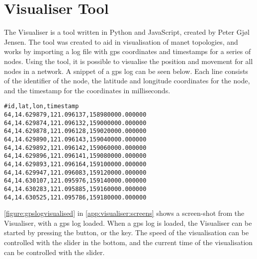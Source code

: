 \section{Visualiser Tool}\label{sec:visualiser}
The Visualiser is a tool written in Python and JavaScript, created by Peter Gjøl Jensen. The tool was created
to aid in visualisation of \gls{manet} topologies, and works by importing a log file with \acrshort{gps}
coordinates and timestamps for a series of nodes. Using the tool, it is possible to visualise the position and
movement for all nodes in a network. A snippet of a \acrshort{gps} log can be seen below. Each line consists
of the identifier of the node, the latitude and longitude coordinates for the node, and the timestamp for the
coordinates in milliseconds.
%
\begin{verbatim}
#id,lat,lon,timestamp
64,14.629879,121.096137,158980000.000000
64,14.629874,121.096132,159000000.000000
64,14.629878,121.096128,159020000.000000
64,14.629890,121.096143,159040000.000000
64,14.629892,121.096142,159060000.000000
64,14.629896,121.096141,159080000.000000
64,14.629893,121.096164,159100000.000000
64,14.629947,121.096083,159120000.000000
64,14.630107,121.095976,159140000.000000
64,14.630283,121.095885,159160000.000000
64,14.630525,121.095786,159180000.000000
\end{verbatim}

\autoref{figure:gpslogvisualised} in \autoref{app:visualiser:screens} shows a screen-shot from the Visualiser,
with a \acrshort{gps} log loaded. When a \acrshort{gps} log is loaded, the Visualiser can be started by
pressing the  button, or the  key. The speed of the visualisation can be
controlled with the  slider in the bottom, and the current time of the visualisation can
be controlled with the  slider. 


